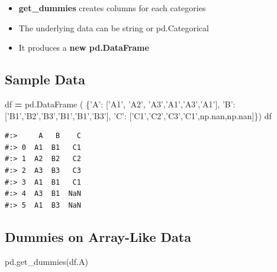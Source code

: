 \documentclass[
]{book}
\newenvironment{Shaded}{\begin{snugshade}}{\end{snugshade}}
\newcommand{\NormalTok}[1]{#1}
\newcommand{\OperatorTok}[1]{\textcolor[rgb]{0.43,0.43,0.43}{\textbf{#1}}}
\newcommand{\StringTok}[1]{\textcolor[rgb]{0.5,0.5,0.5}{#1}}
\providecommand{\tightlist}{%
  \setlength{\itemsep}{0pt}\setlength{\parskip}{0pt}}
\begin{document}
\begin{itemize}
\tightlist
\item
  \textbf{get\_dummies} creates columns for each categories
\item
  The underlying data can be string or pd.Categorical\\
\item
  It produces a \textbf{new pd.DataFrame}
\end{itemize}

\hypertarget{sample-data-13}{%
\subsection{Sample Data}\label{sample-data-13}}

\begin{Shaded}
\begin{Highlighting}[]
\NormalTok{df }\OperatorTok{=}\NormalTok{ pd.DataFrame (}
\NormalTok{    \{}\StringTok{'A'}\NormalTok{: [}\StringTok{'A1'}\NormalTok{, }\StringTok{'A2'}\NormalTok{, }\StringTok{'A3'}\NormalTok{,}\StringTok{'A1'}\NormalTok{,}\StringTok{'A3'}\NormalTok{,}\StringTok{'A1'}\NormalTok{], }
     \StringTok{'B'}\NormalTok{: [}\StringTok{'B1'}\NormalTok{,}\StringTok{'B2'}\NormalTok{,}\StringTok{'B3'}\NormalTok{,}\StringTok{'B1'}\NormalTok{,}\StringTok{'B1'}\NormalTok{,}\StringTok{'B3'}\NormalTok{],}
     \StringTok{'C'}\NormalTok{: [}\StringTok{'C1'}\NormalTok{,}\StringTok{'C2'}\NormalTok{,}\StringTok{'C3'}\NormalTok{,}\StringTok{'C1'}\NormalTok{,np.nan,np.nan]\})}
\NormalTok{df}
\end{Highlighting}
\end{Shaded}

\begin{verbatim}
#:>     A   B    C
#:> 0  A1  B1   C1
#:> 1  A2  B2   C2
#:> 2  A3  B3   C3
#:> 3  A1  B1   C1
#:> 4  A3  B1  NaN
#:> 5  A1  B3  NaN
\end{verbatim}

\hypertarget{dummies-on-array-like-data}{%
\subsection{Dummies on Array-Like Data}\label{dummies-on-array-like-data}}

\begin{Shaded}
\begin{Highlighting}[]
\NormalTok{pd.get_dummies(df.A)}
\end{Highlighting}
\end{Shaded}
\end{document}
